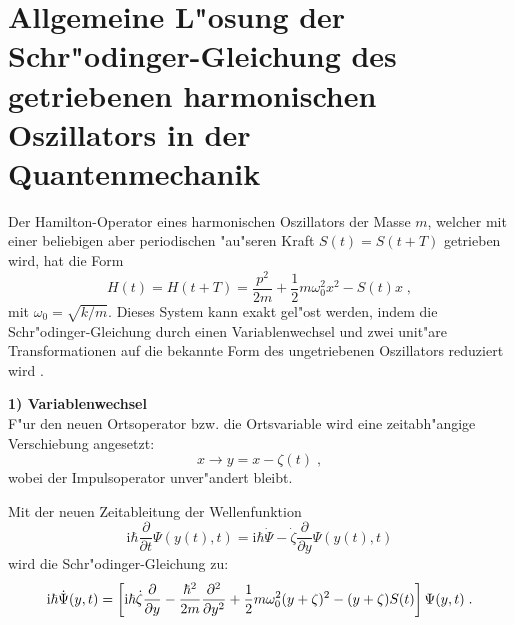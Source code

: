   \newpage



  \section{Allgemeine L"osung der Schr"odinger-Gleichung des getriebenen harmonischen Oszillators in der Quantenmechanik}
    Der Hamilton-Operator eines harmonischen Oszillators der Masse $m$, welcher mit einer beliebigen aber periodischen "au"seren Kraft $S(t)=S(t+T)$ getrieben wird, hat die Form
    \begin{equation}
      H(t) = H(t+T) = \frac{p^2}{2m} + \frac{1}{2}m\omega_0^2x^2-S(t)x \; ,
    \end{equation}
    mit $\omega_0=\sqrt{k/m}$.
    Dieses System kann exakt gel"ost werden, indem die Schr"odinger-Gleichung durch einen Variablenwechsel und zwei unit"are Transformationen auf die bekannte Form des ungetriebenen Oszillators reduziert wird \cite{haenggi}.

    \textbf{1) Variablenwechsel}\\
    F"ur den neuen Ortsoperator bzw. die Ortsvariable wird eine zeitabh"angige Verschiebung angesetzt:
    \begin{equation}
      x \rightarrow y=x-\zeta(t) \; ,
    \end{equation}
    wobei der Impulsoperator unver"andert bleibt.

    Mit der neuen Zeitableitung der Wellenfunktion
    \begin{equation}
      \text{i}\hbar \frac{\partial}{\partial t} \Psi(y(t),t) = \text{i}\hbar \dot{\Psi} -\dot{\zeta}\frac{\partial}{\partial y}\Psi(y(t),t)
    \end{equation}
    wird die Schr"odinger-Gleichung zu:
    \begin{equation}
      \text i \hbar \dot{\Psi}(y,t) = \left[\text i \hbar \dot{\zeta}\frac{\partial}{\partial y}-\frac{\hbar^2}{2m}\frac{\partial^2}{\partial y^2}+\frac{1}{2}m\omega_0^2(y+\zeta)^2-(y+\zeta)S(t)\right]\Psi(y,t) \; .
      \label{schroedinger_einzeln_getrieben}
    \end{equation}

